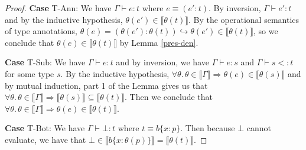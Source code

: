 \documentclass[11pt]{article}
\newcommand{\col}{\mathbin{:}}       %
\newcommand{\lb}{\llbracket}         %
\newcommand{\rb}{\rrbracket}         %
\newcommand{\step}{\hookrightarrow}
\newcommand{\foralltheta}{\forall\theta.\,\theta\in\lb\Gamma\rb}
\begin{document}
\begin{proof}
{\bf Case} {\sc T-Ann}: We have $\Gamma \vdash e : t$ where $e \equiv (e'\col t)$. By inversion, $\Gamma \vdash e' : t$ and by the inductive hypothesis, $\theta(e') \in \lb\theta(t)\rb$. By the operational semantics of type annotations, 
$\theta(e) = (\theta(e')\col\theta(t)) \step \theta(e') \in \lb\theta(t)\rb$, so we conclude that $\theta(e) \in \lb\theta(t)\rb$ by Lemma \ref{pres-den}.

{\bf Case} {\sc T-Sub}: We have $\Gamma \vdash e : t $ and by inversion, we have $\Gamma \vdash e : s$ and $\Gamma \vdash s <: t$ for some type $s$. 
By the inductive hypothesis, $\foralltheta \Rightarrow \theta(e) \in \lb\theta(s)\rb$ and by mutual induction, part 1 of the Lemma gives us that  $\foralltheta \Rightarrow \lb\theta(s)\rb \subseteq \lb\theta(t)\rb$. Then we conclude that $\foralltheta \Rightarrow \theta(e) \in \lb\theta(t)\rb$.

{\bf Case} {\sc T-Bot}: We have $\Gamma \vdash \bot : t$ where $t \equiv b\{x \col p\}$. Then because $\bot$ cannot evaluate, we have that $\bot \in \lb b\{x\col \theta(p)\}\rb = \lb \theta(t)\rb$.
\end{proof}
\end{document}
